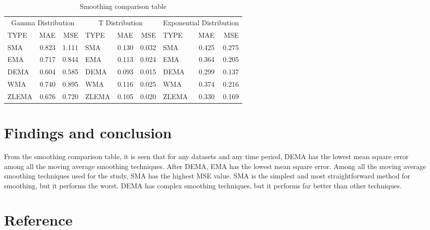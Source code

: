 \documentclass{article}
\begin{document}
\begin{table}[H]

\caption{\label{tab:unnamed-chunk-13}Smoothing comparison table}
\centering
\begin{tabular}[t]{lrrlrrlrr}
\toprule
\multicolumn{3}{c}{Gamma Distribution} & \multicolumn{3}{c}{T Distribution} & \multicolumn{3}{c}{Exponential Distribution} \\
\cmidrule(l{3pt}r{3pt}){1-3} \cmidrule(l{3pt}r{3pt}){4-6} \cmidrule(l{3pt}r{3pt}){7-9}
TYPE & MAE & MSE & TYPE & MAE & MSE & TYPE & MAE & MSE\\
\midrule
SMA & 0.823 & 1.111 & SMA & 0.130 & 0.032 & SMA & 0.425 & 0.275\\
EMA & 0.717 & 0.844 & EMA & 0.113 & 0.024 & EMA & 0.364 & 0.205\\
DEMA & 0.604 & 0.585 & DEMA & 0.093 & 0.015 & DEMA & 0.299 & 0.137\\
WMA & 0.740 & 0.895 & WMA & 0.116 & 0.025 & WMA & 0.374 & 0.216\\
ZLEMA & 0.676 & 0.720 & ZLEMA & 0.105 & 0.020 & ZLEMA & 0.330 & 0.169\\
\bottomrule
\end{tabular}
\end{table}

\hypertarget{findings-and-conclusion}{%
\section{Findings and conclusion}\label{findings-and-conclusion}}

From the smoothing comparison table, it is seen that for any datasets
and any time period, DEMA has the lowest mean square error among all the
moving average smoothing techniques. After DEMA, EMA has the lowest mean
square error. Among all the moving average smoothing techniques used for
the study, SMA has the highest MSE value. SMA is the simplest and most
straightforward method for smoothing, but it performs the worst. DEMA
has complex smoothing techniques, but it performs far better than other
techniques.

\hypertarget{reference}{%
\section*{Reference}\label{reference}}
\end{document}
